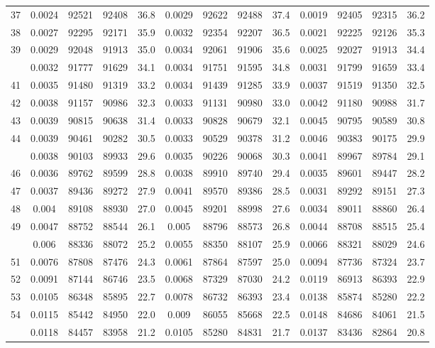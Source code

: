 \documentclass[
  14pt,
]{article}
\begin{document}
\begin{longtable}[t]{lcccccccccccc}
37 & 0.0024 & 92521 & 92408 & 36.8 & 0.0029 & 92622 & 92488 & 37.4 & 0.0019 & 92405 & 92315 & 36.2\\
38 & 0.0027 & 92295 & 92171 & 35.9 & 0.0032 & 92354 & 92207 & 36.5 & 0.0021 & 92225 & 92126 & 35.3\\
39 & 0.0029 & 92048 & 91913 & 35.0 & 0.0034 & 92061 & 91906 & 35.6 & 0.0025 & 92027 & 91913 & 34.4\\
\addlinespace
40 & 0.0032 & 91777 & 91629 & 34.1 & 0.0034 & 91751 & 91595 & 34.8 & 0.0031 & 91799 & 91659 & 33.4\\
41 & 0.0035 & 91480 & 91319 & 33.2 & 0.0034 & 91439 & 91285 & 33.9 & 0.0037 & 91519 & 91350 & 32.5\\
42 & 0.0038 & 91157 & 90986 & 32.3 & 0.0033 & 91131 & 90980 & 33.0 & 0.0042 & 91180 & 90988 & 31.7\\
43 & 0.0039 & 90815 & 90638 & 31.4 & 0.0033 & 90828 & 90679 & 32.1 & 0.0045 & 90795 & 90589 & 30.8\\
44 & 0.0039 & 90461 & 90282 & 30.5 & 0.0033 & 90529 & 90378 & 31.2 & 0.0046 & 90383 & 90175 & 29.9\\
\addlinespace
45 & 0.0038 & 90103 & 89933 & 29.6 & 0.0035 & 90226 & 90068 & 30.3 & 0.0041 & 89967 & 89784 & 29.1\\
46 & 0.0036 & 89762 & 89599 & 28.8 & 0.0038 & 89910 & 89740 & 29.4 & 0.0035 & 89601 & 89447 & 28.2\\
47 & 0.0037 & 89436 & 89272 & 27.9 & 0.0041 & 89570 & 89386 & 28.5 & 0.0031 & 89292 & 89151 & 27.3\\
48 & 0.004 & 89108 & 88930 & 27.0 & 0.0045 & 89201 & 88998 & 27.6 & 0.0034 & 89011 & 88860 & 26.4\\
49 & 0.0047 & 88752 & 88544 & 26.1 & 0.005 & 88796 & 88573 & 26.8 & 0.0044 & 88708 & 88515 & 25.4\\
\addlinespace
50 & 0.006 & 88336 & 88072 & 25.2 & 0.0055 & 88350 & 88107 & 25.9 & 0.0066 & 88321 & 88029 & 24.6\\
51 & 0.0076 & 87808 & 87476 & 24.3 & 0.0061 & 87864 & 87597 & 25.0 & 0.0094 & 87736 & 87324 & 23.7\\
52 & 0.0091 & 87144 & 86746 & 23.5 & 0.0068 & 87329 & 87030 & 24.2 & 0.0119 & 86913 & 86393 & 22.9\\
53 & 0.0105 & 86348 & 85895 & 22.7 & 0.0078 & 86732 & 86393 & 23.4 & 0.0138 & 85874 & 85280 & 22.2\\
54 & 0.0115 & 85442 & 84950 & 22.0 & 0.009 & 86055 & 85668 & 22.5 & 0.0148 & 84686 & 84061 & 21.5\\
\addlinespace
55 & 0.0118 & 84457 & 83958 & 21.2 & 0.0105 & 85280 & 84831 & 21.7 & 0.0137 & 83436 & 82864 & 20.8\\

\end{longtable}
\end{document}
